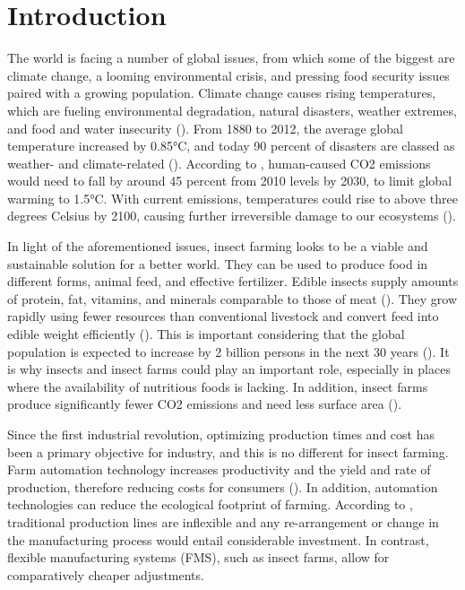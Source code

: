 \section{Introduction}\label{introduction}
The world is facing a number of global issues, from which some of the biggest are climate change, a looming environmental crisis, and pressing food security issues paired with a growing population. Climate change causes rising temperatures, which are fueling environmental degradation, natural disasters, weather extremes, and food and water insecurity (). From 1880 to 2012, the average global temperature increased by 0.85°C, and today 90 percent of disasters are classed as weather- and climate-related (). According to , human-caused CO2 emissions would need to fall by around 45 percent from 2010 levels by 2030, to limit global warming to 1.5°C. With current emissions, temperatures could rise to above three degrees Celsius by 2100, causing further irreversible damage to our ecosystems ().

In light of the aforementioned issues, insect farming looks to be a viable and sustainable solution for a better world. They can be used to produce food in different forms, animal feed, and effective fertilizer. Edible insects supply amounts of protein, fat, vitamins, and minerals comparable to those of meat (\cite{BAIANO2020}). They grow rapidly using fewer resources than conventional livestock and convert feed into edible weight efficiently (\cite{BAIANO2020}). This is important considering that the global population is expected to increase by 2 billion persons in the next 30 years (). It is why insects and insect farms could play an important role, especially in places where the availability of nutritious foods is lacking. In addition, insect farms produce significantly fewer CO2 emissions and need less surface area (\cite{buzzfood}). 

Since the first industrial revolution, optimizing production times and cost has been a primary objective for industry, and this is no different for insect farming. Farm automation technology increases productivity and the yield and rate of production, therefore reducing costs for consumers (\cite{ku2021}). In addition, automation technologies can reduce the ecological footprint of farming. According to \cite{Lynch}, traditional production lines are inflexible and any re-arrangement or change in the manufacturing process would entail considerable investment. In contrast, flexible manufacturing systems (FMS), such as insect farms, allow for comparatively cheaper adjustments.

